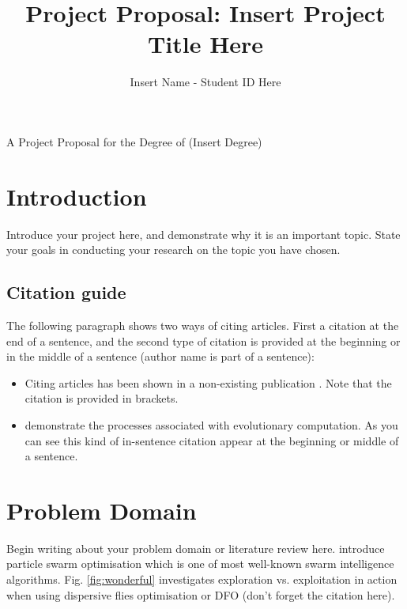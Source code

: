 \documentclass{article} %
\begin{document}

\title{Project Proposal: Insert Project Title Here} %
\author{Insert Name - Student ID Here} %

\maketitle %

{
	\centering
	A Project Proposal for the Degree of (Insert Degree)

} %

\section{Introduction} %

Introduce your project here, and demonstrate why it is an important topic. State your goals in conducting your research on the topic you have chosen.

\subsection{Citation guide}
The following paragraph shows two ways of citing articles. First a citation at the end of a sentence, and the second type of citation is provided at the beginning or in the middle of a sentence (author name is part of a sentence): 
\begin{itemize}
	\item Citing articles has been shown in a non-existing publication \citep{citeme}. Note that the citation is provided in brackets.
	\item \cite{back1997handbook} demonstrate the processes associated with evolutionary computation. As you can see this kind of in-sentence citation appear at the beginning or middle of a sentence.
\end{itemize} 



\section{Problem Domain}
Begin writing about your problem domain or literature review here. \cite{kennedy1995particle} introduce particle swarm optimisation which is one of most well-known swarm intelligence algorithms. Fig. \ref{fig:wonderful} investigates exploration vs. exploitation in action when using dispersive flies optimisation or DFO (don't forget the citation here).
\end{document}
